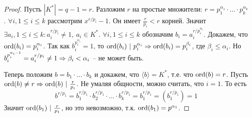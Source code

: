 \begin{proof}
	Пусть $|K^*| = q - 1 = r$. Разложим $r$ на простые множители: $r = p_1^{\alpha_1} \cdot ... \cdot p_k^{\alpha_k}$.
	$\forall i, 1 \leqslant i \leqslant k$ рассмотрим $x^{r / p_i} - 1$. Он имеет $\frac{r}{p_i} < r$ корней. Значит $\exists a_i, 1 \leqslant i \leqslant k : a_i^{r / p_i} \neq 1, \ a_i \in K^*$.
	$\forall i, 1 \leqslant i \leqslant k$ обозначим $b_i = a_i^{r / p_i^{\alpha_i}}$.
	Докажем, что $\operatorname{ord} (b_i) = p_i^{\alpha_i}$. Так как $b_i^{p_i^{\alpha_i}} = 1$, то $\operatorname{ord}(b_i) \ | \ p_i^{\alpha_i} \Rightarrow \operatorname{ord}(b_i) = p_i^{\beta_i}$, где $\beta_i \leqslant \alpha_i$. 
	Но $b_i^{p_i^{\alpha_i - 1}} = a_i^{r / p_i} \neq 1 \Rightarrow \beta_i < \alpha_i$ -- не может быть.
	
	Теперь положим $b = b_1 \cdot ... \cdot b_k$ и докажем, что $\langle b\rangle = K^*$, т.е. что $\operatorname{ord}(b) = r$. 
	Пусть $\Ord(b) \neq r \SO \Ord(b) \ | \ \frac{r}{p_i}$. Не умаляя общности, можно считать, что $i = 1$.
	То есть 
	\[b^{r / p_1} = b_1^{r / p_1} \cdot b_2^{r / p_1} \cdot ... \cdot b_k^{r / p_1} = b_1^{r / p_1} = \left(b_1^{r / p_1}\right) = 1\]
	Значит $\operatorname{ord}(b_1) \ | \ \frac{r}{p_1}$, но это невозможно, т.к. $\operatorname{ord}(b_1) = p^{\alpha_1}$. 
\end{proof}

